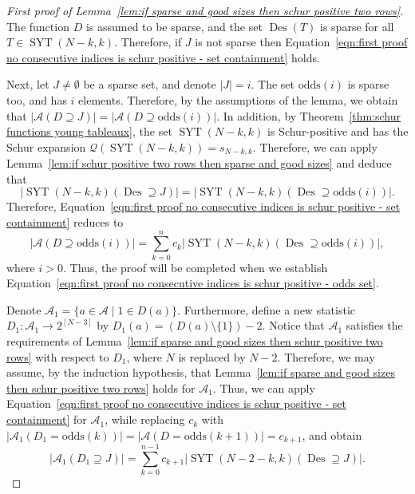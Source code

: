 \documentclass[11pt]{article}
\theoremstyle{definition}
\numberwithin{equation}{section}
\newcommand{\Des}{\operatorname{Des}}
\newcommand{\Syt}{\operatorname{SYT}}
\newcommand{\Q}{\mathcal{Q}}
\newcommand{\A}{\mathcal{A}}
\newcommand{\odds}{\mathrm{odds}}
\begin{document}
\begin{proof}[First proof of Lemma~\ref{lem:if sparse and good sizes then schur positive two rows}]
    The function $D$ is assumed to be sparse, and the set $\Des(T)$ is sparse for all $T \in \Syt(N-k,k)$. Therefore, if $J$ is not sparse then Equation~\eqref{eqn:first proof no consecutive indices is schur positive - set containment} holds.

    Next, let $J \ne \emptyset$ be a sparse set, and denote $|J| = i$. The set $\odds(i)$ is sparse too, and has $i$ elements. Therefore, by the assumptions of the lemma, we obtain that $\left|\A(D \supseteq J)\right| = \left|\A(D \supseteq \odds(i))\right|$.
    In addition, by Theorem~\ref{thm:schur functions young tableaux}, the set $\Syt(N-k,k)$ is Schur-positive and has the Schur expansion $\Q(\Syt(N-k,k)) = s_{N-k,k}$. Therefore, we can apply Lemma~\ref{lem:if schur positive two rows then sparse and good sizes} and deduce that
    \[
        \left|\Syt(N-k,k)(\Des \supseteq J)\right| = \left|\Syt(N-k,k)(\Des \supseteq \odds(i))\right|.
    \]
    Therefore, Equation~\ref{eqn:first proof no consecutive indices is schur positive - set containment} reduces to
    \begin{equation}\label{eqn:first proof no consecutive indices is schur positive - odds set}
        \left|\A(D \supseteq \odds(i))\right| = \sum_{k=0}^n c_k \left|\Syt(N-k,k)(\Des \supseteq \odds(i))\right|,
    \end{equation}
    where $i > 0$. Thus, the proof will be completed when we establish Equation~\eqref{eqn:first proof no consecutive indices is schur positive - odds set}.
    
    Denote $\A_1 = \{a \in \A \mid 1\in D(a)\}$. Furthermore, define a new statistic $D_1:\A_1 \to 2^{[N-3]}$ by $D_1(a) = (D(a)\setminus\{1\})-2$. Notice that $\A_1$ satisfies the requirements of Lemma~\ref{lem:if sparse and good sizes then schur positive two rows} with respect to $D_1$, where $N$ is replaced by $N-2$. Therefore, we may assume, by the induction hypothesis, that Lemma~\ref{lem:if sparse and good sizes then schur positive two rows} holds for $\A_1$. Thus, we can apply Equation~\eqref{eqn:first proof no consecutive indices is schur positive - set containment} for $\A_1$, while replacing $c_k$ with $|\A_1(D_1 = \odds(k))| = |\A(D = \odds(k+1))| = c_{k+1}$, and obtain
    \begin{equation}\label{eqn:first proof no consecutive indices is schur positive - induction}
        \left|\A_1(D_1 \supseteq J)\right| = \sum_{k=0}^{n-1} c_{k+1} \left|\Syt(N-2-k,k)(\Des \supseteq J)\right|.
    \end{equation}
    

\end{proof}
\end{document}
